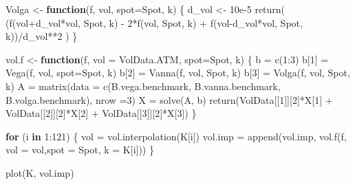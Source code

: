 \documentclass[
]{article}
\newenvironment{Shaded}{\begin{snugshade}}{\end{snugshade}}
\newcommand{\AttributeTok}[1]{\textcolor[rgb]{0.77,0.63,0.00}{#1}}
\newcommand{\ControlFlowTok}[1]{\textcolor[rgb]{0.13,0.29,0.53}{\textbf{#1}}}
\newcommand{\DecValTok}[1]{\textcolor[rgb]{0.00,0.00,0.81}{#1}}
\newcommand{\FloatTok}[1]{\textcolor[rgb]{0.00,0.00,0.81}{#1}}
\newcommand{\FunctionTok}[1]{\textcolor[rgb]{0.00,0.00,0.00}{#1}}
\newcommand{\NormalTok}[1]{#1}
\newcommand{\OtherTok}[1]{\textcolor[rgb]{0.56,0.35,0.01}{#1}}
\newcommand{\SpecialCharTok}[1]{\textcolor[rgb]{0.00,0.00,0.00}{#1}}
\begin{document}
\begin{Shaded}
\begin{Highlighting}[]
\NormalTok{Volga }\OtherTok{\textless{}{-}} \ControlFlowTok{function}\NormalTok{(f, vol, }\AttributeTok{spot=}\NormalTok{Spot, k) \{}
\NormalTok{  d\_vol }\OtherTok{\textless{}{-}} \FloatTok{10e{-}5}
  \FunctionTok{return}\NormalTok{( (}\FunctionTok{f}\NormalTok{(vol}\SpecialCharTok{+}\NormalTok{d\_vol}\SpecialCharTok{*}\NormalTok{vol, Spot, k) }\SpecialCharTok{{-}} \DecValTok{2}\SpecialCharTok{*}\FunctionTok{f}\NormalTok{(vol, Spot, k) }\SpecialCharTok{+} \FunctionTok{f}\NormalTok{(vol}\SpecialCharTok{{-}}\NormalTok{d\_vol}\SpecialCharTok{*}\NormalTok{vol, Spot, k))}\SpecialCharTok{/}\NormalTok{d\_vol}\SpecialCharTok{**}\DecValTok{2}\NormalTok{ )}
\NormalTok{  \}}

\NormalTok{vol.f }\OtherTok{\textless{}{-}} \ControlFlowTok{function}\NormalTok{(f, }\AttributeTok{vol =}\NormalTok{ VolData.ATM, }\AttributeTok{spot=}\NormalTok{Spot, k) \{}
\NormalTok{  b }\OtherTok{=} \FunctionTok{c}\NormalTok{(}\DecValTok{1}\SpecialCharTok{:}\DecValTok{3}\NormalTok{)}
\NormalTok{  b[}\DecValTok{1}\NormalTok{] }\OtherTok{=} \FunctionTok{Vega}\NormalTok{(f, vol, }\AttributeTok{spot=}\NormalTok{Spot, k)}
\NormalTok{  b[}\DecValTok{2}\NormalTok{] }\OtherTok{=} \FunctionTok{Vanna}\NormalTok{(f, vol, Spot, k)}
\NormalTok{  b[}\DecValTok{3}\NormalTok{] }\OtherTok{=} \FunctionTok{Volga}\NormalTok{(f, vol, Spot, k)}
\NormalTok{  A }\OtherTok{=} \FunctionTok{matrix}\NormalTok{(}\AttributeTok{data =} \FunctionTok{c}\NormalTok{(B.vega.benchmark, B.vanna.benchmark, B.volga.benchmark), }\AttributeTok{nrow =}\DecValTok{3}\NormalTok{)}
\NormalTok{  X }\OtherTok{=} \FunctionTok{solve}\NormalTok{(A, b)}
  \FunctionTok{return}\NormalTok{(VolData[[}\DecValTok{1}\NormalTok{]][}\DecValTok{2}\NormalTok{]}\SpecialCharTok{*}\NormalTok{X[}\DecValTok{1}\NormalTok{] }\SpecialCharTok{+}\NormalTok{ VolData[[}\DecValTok{2}\NormalTok{]][}\DecValTok{2}\NormalTok{]}\SpecialCharTok{*}\NormalTok{X[}\DecValTok{2}\NormalTok{] }\SpecialCharTok{+}\NormalTok{ VolData[[}\DecValTok{3}\NormalTok{]][}\DecValTok{2}\NormalTok{]}\SpecialCharTok{*}\NormalTok{X[}\DecValTok{3}\NormalTok{])}
\NormalTok{\}}


\ControlFlowTok{for}\NormalTok{ (i }\ControlFlowTok{in} \DecValTok{1}\SpecialCharTok{:}\DecValTok{121}\NormalTok{) \{}
\NormalTok{  vol }\OtherTok{=} \FunctionTok{vol.interpolation}\NormalTok{(K[i])}
\NormalTok{  vol.imp }\OtherTok{=} \FunctionTok{append}\NormalTok{(vol.imp, }\FunctionTok{vol.f}\NormalTok{(f, }\AttributeTok{vol =}\NormalTok{ vol,}\AttributeTok{spot =}\NormalTok{ Spot, }\AttributeTok{k =}\NormalTok{ K[i]))}
\NormalTok{\}}

\FunctionTok{plot}\NormalTok{(K, vol.imp)}
\end{Highlighting}
\end{Shaded}
\end{document}
